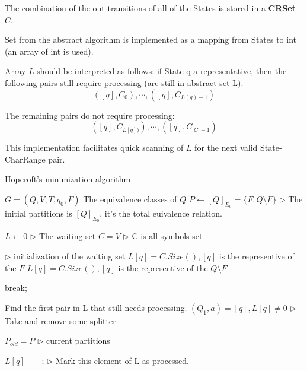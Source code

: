 The combination of the out-transitions of all of the States is stored in a
\textbf{CRSet $C$}. 

Set  from the abstract algorithm is implemented as a mapping from States to int (an array of int is used). 

Array $L$ should be interpreted as follows: if State q a representative,
then the following pairs still require processing (are still in abstract set L):
$$([q], C_0),\cdots, ([q], C_{L(q)-1}) $$

The remaining pairs do not require processing:
$$([q], C_{L[q])}),\cdots, ([q], C_{|C|-1}) $$

This implementation facilitates quick scanning of $L$ for the next valid State-CharRange pair.

\begin{algorithm}  
	\caption{Hopcroft's minimization algorithm}  \label{alg:hopcroft}
	\begin{algorithmic}[1] %
		\Require $G =(Q,V,T,q_0,F)$  
		\Ensure The equivalence classes of $Q$  
		\State $P \gets [Q]_{E_0}=\{F,Q\setminus F \}$  \qquad\qquad $\triangleright$ The initial partitions is $[Q]_{E_0}$, it's the total euivalence relation.
		
		\State $L \gets 0$  \qquad\qquad $\triangleright$ The waiting set
		\State $C = V$  \qquad\qquad $\triangleright$ C is all symbols set
		
		  \qquad\qquad 			$\triangleright$ initialization of the waiting set
			\State $L[q]=C.Size(), [q]$ is the representive of the $F$
		\Else
			\State $L[q]=C.Size(), [q]$ is the representive of the $Q\setminus F$
		\EndIf
		
				\State break;
			\EndIf
			
			\State Find the first pair in L that still needs processing. $(Q_1,a) = [q], L[q]\ne 0$ \qquad\qquad $\triangleright$ Take and remove some splitter
			
			\State $P_{old} = P$  \qquad\qquad $\triangleright$ current partitions
			
			\State $L[q]--$; \qquad\qquad $\triangleright$ Mark this element of L as processed.
	

\end{algorithmic}
\end{algorithm}
